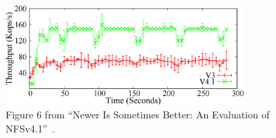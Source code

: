 \begin{figure}[h]
\centering\includegraphics[width=0.8\textwidth]{images/nfsv41better-reading-small-files.png}
\caption{Figure 6 from ``Newer Is Sometimes Better: An Evaluation of NFSv4.1''~\cite{NFSv4Better}.}
\end{figure}
